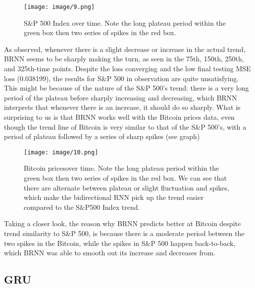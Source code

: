 \documentclass[letterpaper, 10 pt, conference]{ieeeconf}  %
\begin{document}
        \begin{figure}[thpb]
            \centering
            \texttt{[image: image/9.png]}
            \caption{S\&P 500 Index over time. Note the long plateau period within the green box then two series of spikes in the red box.}
            \label{figurelabel}
        \end{figure}

        As observed, whenever there is a slight decrease or increase in the actual trend, BRNN seems to be sharply making the turn, as seen in the 75th, 150th, 250th, and 325th-time points. Despite the loss converging and the low final testing MSE loss (0.038199), the results for S\&P 500 in observation are quite unsatisfying. This might be because of the nature of the S\&P 500's trend: there is a very long period of the plateau before sharply increasing and decreasing, which BRNN interprets that whenever there is an increase, it should do so sharply. What is surprising to us is that BRNN works well with the Bitcoin prices data, even though the trend line of Bitcoin is very similar to that of the S\&P 500's, with a period of plateau followed by a series of sharp spikes (see graph)
        
        \begin{figure}[thpb]
            \centering
            \texttt{[image: image/10.png]}
            \caption{Bitcoin pricesover time. Note the long plateau period within the green box then two series of spikes in the red box. We can see that there are alternate between plateau or slight fluctuation and spikes, which make the bidirectional RNN pick up the trend easier compared to the S\&P500 Index trend.}
            \label{figurelabel}
        \end{figure}

        Taking a closer look, the reason why BRNN predicts better at Bitcoin despite trend similarity to S\&P 500, is because there is a moderate period between the two spikes in the Bitcoin, while the spikes in S\&P 500 happen back-to-back, which BRNN was able to smooth out its increase and decreases from.

    \subsection{GRU}
\end{document}
